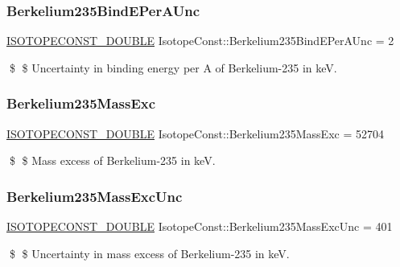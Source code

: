 \subsubsection{\texorpdfstring{Berkelium235\+Bind\+E\+Per\+A\+Unc}{Berkelium235BindEPerAUnc}}
{\footnotesize\ttfamily \mbox{\hyperlink{group___isotope_const-_macros_ga8f45a7272ce02c0b4c65c44636ed719a}{I\+S\+O\+T\+O\+P\+E\+C\+O\+N\+S\+T\+\_\+\+D\+O\+U\+B\+LE}} Isotope\+Const\+::\+Berkelium235\+Bind\+E\+Per\+A\+Unc = 2}

\$ \$ Uncertainty in binding energy per A of Berkelium-\/235 in keV. \mbox{\label{group___isotope_const-_berkelium-_bk235_gad45218ed9ace9349616c6a656540fe63}} 
\subsubsection{\texorpdfstring{Berkelium235\+Mass\+Exc}{Berkelium235MassExc}}
{\footnotesize\ttfamily \mbox{\hyperlink{group___isotope_const-_macros_ga8f45a7272ce02c0b4c65c44636ed719a}{I\+S\+O\+T\+O\+P\+E\+C\+O\+N\+S\+T\+\_\+\+D\+O\+U\+B\+LE}} Isotope\+Const\+::\+Berkelium235\+Mass\+Exc = 52704}

\$ \$ Mass excess of Berkelium-\/235 in keV. \mbox{\label{group___isotope_const-_berkelium-_bk235_ga960e0f6d2b988386c9455991507ca1c6}} 
\subsubsection{\texorpdfstring{Berkelium235\+Mass\+Exc\+Unc}{Berkelium235MassExcUnc}}
{\footnotesize\ttfamily \mbox{\hyperlink{group___isotope_const-_macros_ga8f45a7272ce02c0b4c65c44636ed719a}{I\+S\+O\+T\+O\+P\+E\+C\+O\+N\+S\+T\+\_\+\+D\+O\+U\+B\+LE}} Isotope\+Const\+::\+Berkelium235\+Mass\+Exc\+Unc = 401}

\$ \$ Uncertainty in mass excess of Berkelium-\/235 in keV. \mbox{\label{group___isotope_const-_berkelium-_bk235_ga72a61027a318a0761a7d6aa1095aba06}} 
